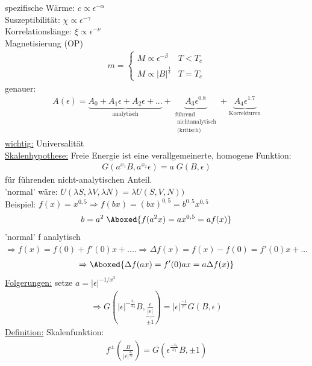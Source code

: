\documentclass[12pt]{article}
\begin{document}
spezifische Wärme: $c \propto \epsilon^{-\alpha}$\\
Suszeptibilität: $\chi \propto \epsilon^{-\gamma}$\\
Korrelationslänge: $\xi \propto \epsilon^{-\nu}$\\ 
Magnetisierung (OP) \begin{align}
m= \begin{cases}
M \propto \epsilon^{-\beta} & T<T_c \\
M \propto \vert B \vert ^\frac{1}{\delta} & T=T_c
\end{cases}
\end{align}
genauer: \begin{align*}
A(\epsilon)= 
\underbrace{ A_0 + A_1 \epsilon + A_2 \epsilon +...}_\text{analytisch} 
+ \underbrace{ A_3 \epsilon^{0.8}}_{\substack{ \text{führend} \\ \text{ nichtanalytisch} \\ \text{ (kritisch)} }}
+ \underbrace{ A_4 \epsilon^{1.7}}_\text{Korrekturen}
\end{align*}
\underline{wichtig:} Universalität \\
\underline{Skalenhypothese:} Freie Energie ist eine verallgemeinerte, homogene Funktion: \begin{align}
G(a^{x_1} B, a^{x_2} \epsilon)= a \; G(B, \epsilon)
\end{align} 
für führenden nicht-analytischen Anteil. \\
'normal' wäre: $U( \lambda S, \lambda V, \lambda N) = \lambda U(S,V,N))$ \\
Beispiel: $f(x) = x^{0,5} \Rightarrow f(bx) = (bx)^{0,5} = b^{0,5} x^{0,5}$ \\ \begin{align*}
b=a^2 \;  \Aboxed{ f(a^2 x)=  a x^{0,5} = a f(x)}
\end{align*}
'normal' f analytisch $\Rightarrow f(x)= f(0) + f'(0)x + .... \Rightarrow \Delta f(x) = f(x) - f(0) = f'(0)x+...$
\begin{align}
\Rightarrow \Aboxed{ \Delta f(ax) = f'(0) ax= a \Delta f(x)}
\end{align}
\underline{Folgerungen:} setze $ a= \vert \epsilon \vert ^{-1/x^2}$
\begin{align}
\Rightarrow G\left(\vert \epsilon \vert ^{-\frac{x_1}{x_2}} B, \underbrace{ \frac{\epsilon}{\vert \epsilon \vert}}_{\pm 1} \right) = \vert \epsilon \vert^\frac{-1}{x^2} G(B, \epsilon)
\end{align}
\underline{Definition:} Skalenfunktion: \begin{align}
f^\pm \left( \frac{B}{\vert \epsilon \vert ^\frac{x_1}{x_2}} \right) = G \left( \epsilon^\frac{-x_1}{x_2} B, \pm 1 \right)
\end{align} 
\end{document}
